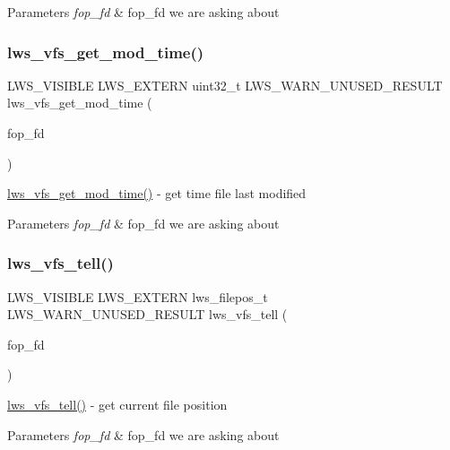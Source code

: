 \begin{DoxyParams}{Parameters}
{\em fop\+\_\+fd} & fop\+\_\+fd we are asking about \\
\hline
\end{DoxyParams}
\mbox{\label{group__fops_ga1d1e9a470d48eeff0f18934c9338c5ed}} 
\subsubsection{\texorpdfstring{lws\+\_\+vfs\+\_\+get\+\_\+mod\+\_\+time()}{lws\_vfs\_get\_mod\_time()}}
{\footnotesize\ttfamily L\+W\+S\+\_\+\+V\+I\+S\+I\+B\+LE L\+W\+S\+\_\+\+E\+X\+T\+E\+RN uint32\+\_\+t L\+W\+S\+\_\+\+W\+A\+R\+N\+\_\+\+U\+N\+U\+S\+E\+D\+\_\+\+R\+E\+S\+U\+LT lws\+\_\+vfs\+\_\+get\+\_\+mod\+\_\+time (\begin{DoxyParamCaption}\item[{\hyperlink{structlws__fop__fd}{lws\+\_\+fop\+\_\+fd\+\_\+t}}]{fop\+\_\+fd }\end{DoxyParamCaption})}

\hyperlink{group__fops_ga1d1e9a470d48eeff0f18934c9338c5ed}{lws\+\_\+vfs\+\_\+get\+\_\+mod\+\_\+time()} -\/ get time file last modified


\begin{DoxyParams}{Parameters}
{\em fop\+\_\+fd} & fop\+\_\+fd we are asking about \\
\hline
\end{DoxyParams}
\mbox{\label{group__fops_ga3e71b9e0f12cfe134ab1c9689ff5463b}} 
\subsubsection{\texorpdfstring{lws\+\_\+vfs\+\_\+tell()}{lws\_vfs\_tell()}}
{\footnotesize\ttfamily L\+W\+S\+\_\+\+V\+I\+S\+I\+B\+LE L\+W\+S\+\_\+\+E\+X\+T\+E\+RN lws\+\_\+filepos\+\_\+t L\+W\+S\+\_\+\+W\+A\+R\+N\+\_\+\+U\+N\+U\+S\+E\+D\+\_\+\+R\+E\+S\+U\+LT lws\+\_\+vfs\+\_\+tell (\begin{DoxyParamCaption}\item[{\hyperlink{structlws__fop__fd}{lws\+\_\+fop\+\_\+fd\+\_\+t}}]{fop\+\_\+fd }\end{DoxyParamCaption})}

\hyperlink{group__fops_ga3e71b9e0f12cfe134ab1c9689ff5463b}{lws\+\_\+vfs\+\_\+tell()} -\/ get current file position


\begin{DoxyParams}{Parameters}
{\em fop\+\_\+fd} & fop\+\_\+fd we are asking about \\
\hline
\end{DoxyParams}
